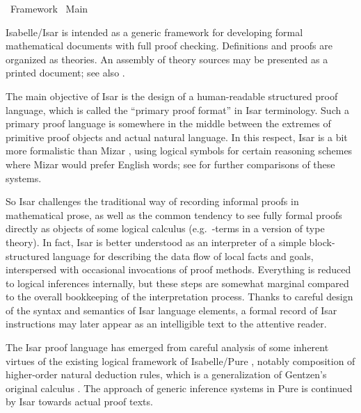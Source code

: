 %
\begin{isabellebody}%
\def\isabellecontext{Framework}%
%
\isadelimtheory
%
\endisadelimtheory
%
\isatagtheory
{}\isamarkupfalse%
\ Framework\isanewline
{}\ Main\isanewline
{}%
\endisatagtheory
{\isafoldtheory}%
%
\isadelimtheory
%
\endisadelimtheory
%
\isamarkuptrue%
%
\begin{isamarkuptext}%
Isabelle/Isar
  \cite{Wenzel:1999:TPHOL,Wenzel-PhD,Nipkow-TYPES02,Wenzel-Paulson:2006,Wenzel:2006:Festschrift}
  is intended as a generic framework for developing formal
  mathematical documents with full proof checking.  Definitions and
  proofs are organized as theories.  An assembly of theory sources may
  be presented as a printed document; see also
  .

  The main objective of Isar is the design of a human-readable
  structured proof language, which is called the ``primary proof
  format'' in Isar terminology.  Such a primary proof language is
  somewhere in the middle between the extremes of primitive proof
  objects and actual natural language.  In this respect, Isar is a bit
  more formalistic than Mizar
  \cite{Trybulec:1993:MizarFeatures,Rudnicki:1992:MizarOverview,Wiedijk:1999:Mizar},
  using logical symbols for certain reasoning schemes where Mizar
  would prefer English words; see \cite{Wenzel-Wiedijk:2002} for
  further comparisons of these systems.

  So Isar challenges the traditional way of recording informal proofs
  in mathematical prose, as well as the common tendency to see fully
  formal proofs directly as objects of some logical calculus (e.g.\
  \isa{{\isachardoublequote}{\isasymlambda}{\isachardoublequote}}-terms in a version of type theory).  In fact, Isar is
  better understood as an interpreter of a simple block-structured
  language for describing the data flow of local facts and goals,
  interspersed with occasional invocations of proof methods.
  Everything is reduced to logical inferences internally, but these
  steps are somewhat marginal compared to the overall bookkeeping of
  the interpretation process.  Thanks to careful design of the syntax
  and semantics of Isar language elements, a formal record of Isar
  instructions may later appear as an intelligible text to the
  attentive reader.

  The Isar proof language has emerged from careful analysis of some
  inherent virtues of the existing logical framework of Isabelle/Pure
  \cite{paulson-found,paulson700}, notably composition of higher-order
  natural deduction rules, which is a generalization of Gentzen's
  original calculus \cite{Gentzen:1935}.  The approach of generic
  inference systems in Pure is continued by Isar towards actual proof
  texts.


\end{isamarkuptext}
\end{isabellebody}
